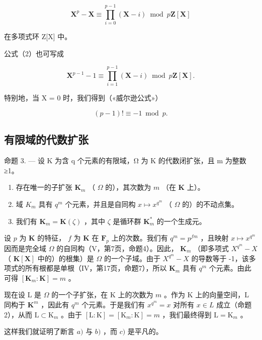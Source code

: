 \[
\mathbf {X} ^ {p} - \mathbf {X} \equiv \prod_ {i = 0} ^ {p - 1} (\mathbf {X} - i) \bmod p \mathbf {Z} [ \mathbf {X} ]\tag{2}
\]

在多项式环 Z{[}X{]} 中。

公式（2）也可写成

\[
\mathbf {X} ^ {p - 1} - 1 \equiv \prod_ {i = 1} ^ {p - 1} (\mathbf {X} - i) \bmod p \mathbf {Z} [ \mathbf {X} ].\tag{3}
\]

特别地，当 X = 0 时，我们得到（«威尔逊公式»）

\[
(p - 1)! \equiv - 1 \bmod p.\tag{4}
\]

\subsection{有限域的代数扩张}

命题 3. --- 设 K 为含 q 个元素的有限域，Ω 为 K 的代数闭扩张，且 m 为整数 ≥1。

\begin{enumerate}
\def\labelenumi{\alph{enumi})}
\item
  存在唯一的子扩张 \(\mathbf{K}_m\) （ \(\Omega\) 的），其次数为 \(m\) （在 \(\mathbf{K}\) 上）。
\item
  域 \(K_{m}\) 具有 \(q^{m}\) 个元素，并且是自同构 \(x \mapsto x^{q^{m}}\) （ \(\Omega\) 的）的不动点集。
\item
  我们有 \(\mathbf{K}_m = \mathbf{K}(\zeta)\) ，其中 \(\zeta\) 是循环群 \(\mathbf{K}_m^*\) 的一个生成元。
\end{enumerate}

设 \(p\) 为 \(\mathbf{K}\) 的特征， \(f\) 为 \(\mathbf{K}\) 在 \(\mathbf{F}_p\) 上的次数。我们有 \(q^m = p^{fm}\) ，且映射 \(x \mapsto x^{q^m}\) 因而是完全域 \(\Omega\) 的自同构（V，第7页，命题4）。因此， \(\mathbf{K}_m\) （即多项式 \(X^{q^m} - X\) （ \(\mathbf{K}[\mathbf{X}]\) 中的）的根集）是 \(\Omega\) 的一个子域。由于 \(X^{q^m} - X\) 的导数等于 -1，该多项式的所有根都是单根（IV，第17页，命题7），所以 \(\mathbf{K}_m\) 具有 \(q^m\) 个元素。由此可得 \([\mathbf{K}_m : \mathbf{K}] = m\) 。

现在设 L 是 \(\Omega\) 的一个子扩张，在 K 上的次数为 \(m\) 。作为 K 上的向量空间，L 同构于 \(\mathbf{K}^m\) ，因此有 \(q^m\) 个元素。于是我们有 \(x^{q^m} = x\) 对所有 \(x \in L\) 成立（命题 2），从而 \(\mathrm{L} \subset \mathrm{K}_m\) 。由于 \([\mathrm{L} : \mathrm{K}] = [\mathrm{K}_m : \mathrm{K}] = m\) ，我们最终得到 \(\mathrm{L} = \mathrm{K}_m\) 。

这样我们就证明了断言 \(a)\) 与 \(b)\) ，而 \(c)\) 是平凡的。

